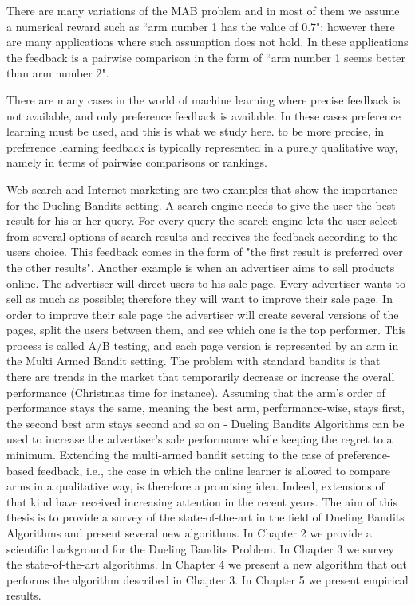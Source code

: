 \documentclass[MSc,beforeExam]{iitcsthesis}
\begin{document}
	There are many variations of the MAB problem and in most of them we assume a numerical reward such as ``arm  number 1 has the value of 0.7"; however there are many applications where such assumption does not hold.
In these applications the feedback is a pairwise comparison in the form of
 ``arm number 1 seems better than arm number 2".  %

	There are many cases in the world of machine learning where precise feedback is not available, and only preference feedback is available. In these cases %
preference learning must be used, and this is what we study here.  		 
	to be more precise, in preference learning feedback is typically represented in a purely qualitative way, namely in terms of pairwise comparisons or rankings. 

	Web search and Internet marketing are two examples that show the importance for the Dueling Bandits setting. A search engine needs to give the user the best result for his or her query. For every query the search engine lets the user select from several options of search results and receives the feedback according to the users choice. This feedback comes in the form of "the first result is preferred over the other results".  
	Another example is when an advertiser aims to sell products online. The advertiser will direct users to his sale page. 
	Every advertiser wants to sell as much as possible; therefore they will want to improve their sale page. In order to improve their sale page the advertiser will create several versions of the pages, split the users between them, and see which one is the top performer. This process is called A/B testing, and each page version is represented by an arm in the Multi Armed Bandit  setting. 
	The problem with standard bandits is that there are trends in the market that temporarily decrease or increase the overall performance (Christmas time for instance).
	Assuming that the arm's order of performance stays the same, meaning the best arm, performance-wise, stays first, the second best arm stays second and so on - Dueling Bandits Algorithms can be used to increase the advertiser's sale performance while keeping the regret to a minimum.
	Extending the multi-armed bandit setting to the case of preference-based feedback, i.e., the case in which the online learner is allowed to compare arms in a qualitative way, is therefore a promising idea. 
	Indeed, extensions of that kind have received increasing attention in the recent years.
	The aim of this thesis is to provide a survey of the state-of-the-art in the field of Dueling Bandits Algorithms and present several new algorithms. 
	In Chapter 2 we provide a scientific background for the Dueling Bandits Problem. In Chapter 3 we survey the state-of-the-art algorithms. In Chapter 4 we present a new algorithm that out performs the algorithm described in Chapter 3. In Chapter 5 we present %
empirical results.
\end{document}
